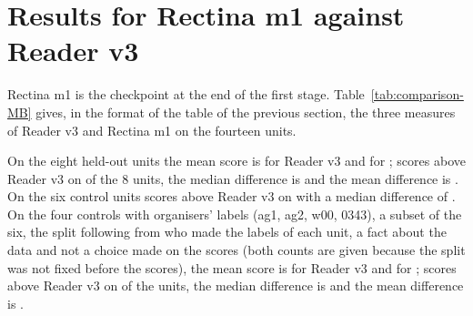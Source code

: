 \section{Results for Rectina m1 against Reader v3}\label{sec:results-MB}

Rectina m1 is the checkpoint at the end of the first stage. Table~\ref{tab:comparison-MB} gives, in the format of the table of the previous section, the three measures of Reader v3 and Rectina m1 on the fourteen units.

\MBHonestSentence{}

\begin{table}[!t]
\caption{Three measures of \MBModelName{} against Reader v3 on the fourteen units, target a: the AUC, the AUC on thin
strokes and false ink at 80 per cent recall. The cell of \MBModelName{} gives in parentheses the signed difference
against Reader v3. The rows Mean and Median are taken \MBStatScope; the
block of the community labels is information only.}\label{tab:comparison-MB}
\centering

\par\smallskip
{\footnotesize\raggedright\par}
\end{table}

On the eight held-out units the mean score is \MBHeldMeanReader{} for Reader v3 and \MBHeldMeanModel{} for \MBModelName{}; \MBModelName{} scores above Reader v3 on \MBHeldAbove{} of the 8
units, the median difference is \MBHeldMedianDiff{} and the mean difference is \MBHeldMeanDiff{}\MBLowHeld. On the six control units \MBModelName{} scores above Reader v3 on \MBStatsCtrlKText{} with a median difference of \MBStatsCtrlMedianDiff{}. On the four controls with organisers' labels (ag1, ag2, w00, 0343), a subset of the six, the split following from who made the labels of each unit, a fact about the data and not a choice made on the scores (both counts are given because the split was not fixed before the scores), the mean score is \MBCtrlMeanReader{} for Reader v3 and \MBCtrlMeanModel{} for
\MBModelName{}; \MBModelName{} scores above Reader v3 on
\MBCtrlAbove{} of the \MBCtrlN{} units, the median difference is \MBCtrlMedianDiff{} and the mean difference is
\MBCtrlMeanDiff{}\MBLowCtrl.

\MBFalseInkParagraph{}

\MBStatsParagraph{} \MBSeedParagraph{}
